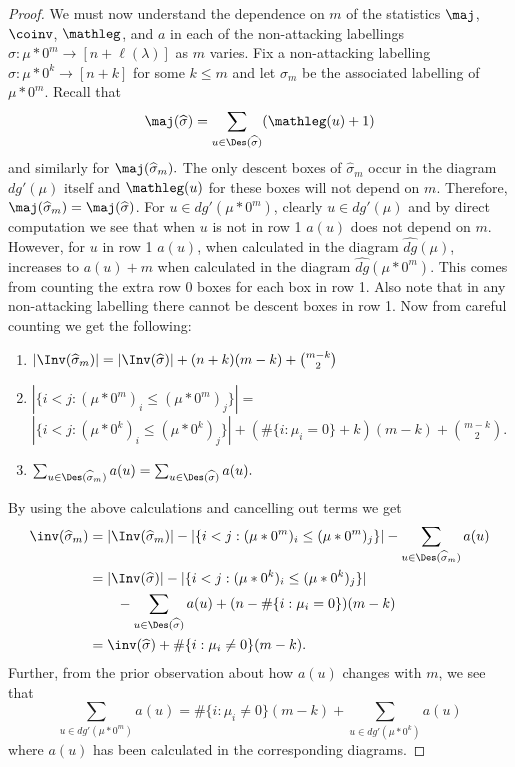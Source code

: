 \begin{proof}
  We must now understand the dependence on $m$ of the statistics $\maj$, $\coinv$, $\mathleg$, and $a$ in each of the non-attacking labellings $\sigma: \mu*0^m \rightarrow [n+\ell(\lambda)]$ as $m$ varies. Fix a non-attacking labelling $\sigma: \mu * 0^k \rightarrow [n+k]$ for some $k \leq m$ and let $\sigma_m$ be the associated labelling of $\mu * 0^m$. Recall that 
  $$\maj(\widehat{\sigma}) = \sum_{u \in \Des(\widehat{\sigma})} (\mathleg(u) + 1)$$
  and similarly for $\maj(\widehat{\sigma}_m).$
  The only descent boxes of $\widehat{\sigma}_m$ occur in the diagram $dg'(\mu)$ itself and $\mathleg(u)$ for these boxes will not depend on $m$. Therefore, $\maj(\widehat{\sigma}_m) = \maj(\widehat{\sigma})$. For $u \in dg'(\mu * 0^m)$, clearly $u \in dg'(\mu)$ and by direct computation we see that when $u$ is not in row 1 $a(u)$ does not depend on $m$. However, for $u$ in row 1 $a(u)$, when calculated in the diagram $\widehat{dg}(\mu)$, increases to $a(u)+m$ when calculated in the diagram $\widehat{dg}(\mu*0^m)$. This comes from counting the extra row 0 boxes for each box in row 1. Also note that in any non-attacking labelling there cannot be descent boxes in row 1. Now from careful counting we get the following:
  \begin{enumerate}
      \item $|\Inv(\widehat{\sigma}_m)| = |\Inv(\widehat{\sigma})| + (n+k)(m-k) + \binom{m-k}{2}$ \\
      \item $|\{i<j : (\mu * 0^m)_i \leq (\mu * 0^m)_j \} | =$ \\ $| \{i<j : (\mu*0^k)_i \leq (\mu*0^k)_j \} | + (\#\{i:\mu_i = 0\} +k)(m-k) + \binom{m-k}{2}$. \\
      \item $\sum_{u \in \Des(\widehat{\sigma}_m)} a(u) = \sum_{u \in \Des(\widehat{\sigma})} a(u).$
  \end{enumerate}
By using the above calculations and cancelling out terms we get
\begin{align*}
    \inv(\widehat{\sigma}_m) &= |\Inv(\widehat{\sigma}_m)| - | \{i<j: (\mu * 0^m)_i \leq (\mu * 0^m)_j \} | - \sum_{u \in \Des(\widehat{\sigma}_m)} a(u) \\
    &= |\Inv(\widehat{\sigma})| - | \{i<j: (\mu*0^k)_i \leq (\mu*0^k)_j \} | \\
    & \qquad - \sum_{u \in \Des(\widehat{\sigma})} a(u) + (n- \#\{i:\mu_i = 0\})(m-k)\\
    &= \inv(\widehat{\sigma}) +\#\{i:\mu_i \neq 0\}(m-k).
\end{align*} 
Further, from the prior observation about how  $a(u)$ changes with $m$, we see that 
  $$\sum_{u \in dg'(\mu * 0^m)} a(u) = \#\{i:\mu_i \neq 0\}(m-k) + \sum_{u \in dg'(\mu*0^k)} a(u)$$
  where $a(u)$ has been calculated in the corresponding diagrams. 


\end{proof}
